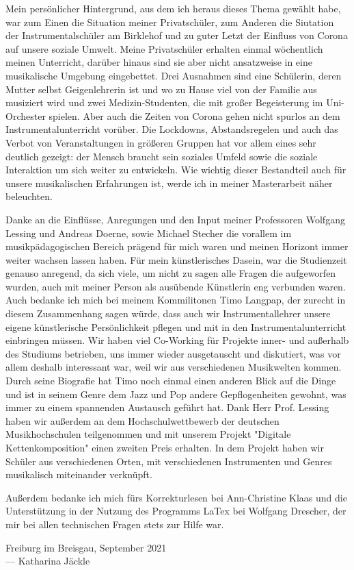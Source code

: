 
Mein persönlicher Hintergrund, aus dem ich heraus dieses Thema gewählt habe, war
zum Einen die Situation meiner Privatschüler, zum Anderen die Siutation der
Instrumentalschüler am Birklehof und zu guter Letzt der Einfluss von Corona auf
unsere soziale Umwelt. Meine Privatschüler erhalten einmal wöchentlich meinen
Unterricht, darüber hinaus sind sie aber nicht ansatzweise in eine musikalische
Umgebung eingebettet. Drei Ausnahmen sind eine Schülerin, deren Mutter
selbst Geigenlehrerin ist und wo zu Hause viel von der Familie aus musiziert wird und zwei
Medizin-Studenten, die mit großer Begeisterung im Uni-Orchester spielen. 
Aber auch die Zeiten von Corona gehen nicht spurlos an dem Instrumentalunterricht
vorüber. Die Lockdowns, Abstandsregelen und auch das Verbot von Veranstaltungen
in größeren Gruppen hat vor allem eines sehr deutlich gezeigt: der Mensch
braucht sein soziales Umfeld sowie die soziale Interaktion um sich weiter zu
entwickeln. Wie wichtig dieser Bestandteil auch für unsere musikalischen
Erfahrungen ist, werde ich in meiner Masterarbeit näher beleuchten.

Danke an die Einflüsse, Anregungen und den Input meiner Professoren Wolfgang
Lessing und Andreas Doerne, sowie Michael Stecher die vorallem im musikpädagogischen Bereich prägend
für mich waren und meinen Horizont immer weiter wachsen lassen haben. Für mein
künstlerisches Dasein, war die Studienzeit genauso anregend, da sich viele, um
nicht zu sagen alle Fragen die aufgeworfen wurden, auch mit meiner Person als
ausübende Künstlerin eng verbunden waren. Auch bedanke ich mich bei meinem
Kommilitonen Timo
Langpap, der zurecht in diesem Zusammenhang sagen würde, dass auch wir
Instrumentallehrer unsere eigene künstlerische Persönlichkeit pflegen und mit in
den Instrumentalunterricht einbringen müssen. Wir haben viel Co-Working für
Projekte inner- und außerhalb des Studiums
betrieben, uns immer wieder ausgetauscht und diskutiert, was vor allem deshalb
interessant war, weil wir aus verschiedenen Musikwelten kommen. Durch seine Biografie
hat Timo noch einmal einen anderen Blick auf die Dinge und ist in seinem Genre dem
Jazz und Pop andere Gepflogenheiten gewohnt, was immer zu einem
spannenden Austausch geführt hat. Dank Herr Prof. Lessing haben wir außerdem an dem Hochschulwettbewerb der deutschen Musikhochschulen teilgenommen
und mit unserem Projekt "Digitale Kettenkomposition" einen zweiten Preis
erhalten. In dem Projekt haben wir Schüler aus verschiedenen Orten, mit
verschiedenen Instrumenten und Genres musikalisch miteinander verknüpft. 

Außerdem bedanke ich mich fürs Korrekturlesen bei Ann-Christine Klaas und die Unterstützung in der
Nutzung des Programms LaTex bei Wolfgang Drescher, der mir bei allen technischen Fragen
stets zur Hilfe war. 




\vspace{0.5cm}

\begin{flushright}
	{
		\small
		Freiburg im Breisgau, September 2021\\
		--- Katharina Jäckle
	}
\end{flushright}
